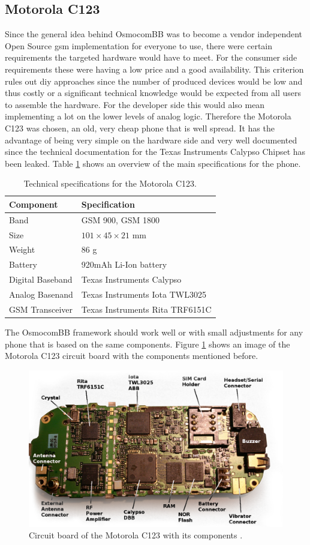 \subsection{Motorola C123}
\label{sec:osmo_phones}
Since the general idea behind OsmocomBB was to become a vendor independent Open Source \gls{gsm} implementation for everyone to use, there were certain requirements the targeted hardware would have to meet.
For the consumer side requirements these were having a low price and a good availability.
This criterion rules out \gls{diy} approaches since the number of produced devices would be low and thus costly or a significant technical knowledge would be expected from all users to assemble the hardware.
For the developer side this would also mean implementing a lot on the lower levels of analog logic.
Therefore the Motorola C123 was chosen, an old, very cheap phone that is well spread.
It has the advantage of being very simple on the hardware side and very well documented since the technical documentation for the Texas Instruments Calypso Chipset \cite{osmo_slides} has been leaked.
Table \ref{tab:c123_specs} shows an overview of the main specifications for the phone.
\begin{table}
\centering
	\begin{tabular}{ll}
	\toprule
	Component			&Specification\\
	\midrule
	Band 				&GSM 900, GSM 1800\\
	Size				&$101\times 45\times 21$ mm\\
	Weight				&86 g\\
	Battery				&920mAh Li-Ion battery\\
	Digital Baseband	&Texas Instruments Calypso\\
	Analog Basenand		&Texas Instruments Iota TWL3025\\
	GSM Transceiver		&Texas Instruments Rita TRF6151C\\
	\bottomrule
	\end{tabular}
	\caption{Technical specifications for the Motorola C123.}
	\label{tab:c123_specs}
\end{table}
The OsmocomBB framework should work well or with small adjustments for any phone that is based on the same components.
Figure \ref{fig:osmo_c123} shows an image of the Motorola C123 circuit board with the components mentioned before.
\begin{figure}
\centering
	\includegraphics[width=.9\textwidth]{../Images/c123_pcb}
	\caption{Circuit board of the Motorola C123 with its components \cite{osmo_wiki_c123}.}
	\label{fig:osmo_c123}
\end{figure}
